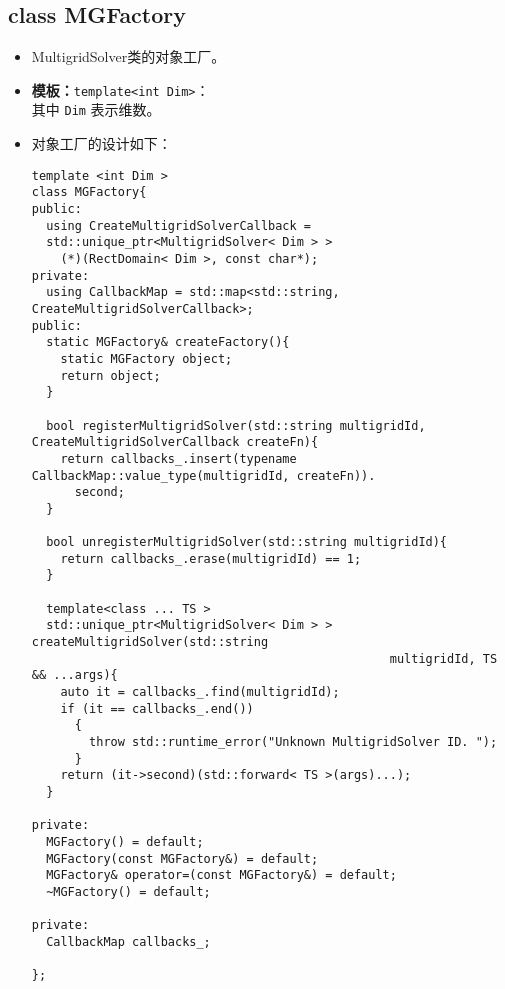 \documentclass[a4paper,twoside]{ctexart}
\begin{document}
\subsection*{class MGFactory}
\begin{itemize}
    \item MultigridSolver类的对象工厂。
    \item \textbf{模板：}\texttt{template<int Dim>}：\\
      其中 \texttt{Dim} 表示维数。
    \item 对象工厂的设计如下：
      \scriptsize
  \begin{lstlisting}
template <int Dim >
class MGFactory{
public:
  using CreateMultigridSolverCallback =
  std::unique_ptr<MultigridSolver< Dim > >
    (*)(RectDomain< Dim >, const char*);
private:
  using CallbackMap = std::map<std::string, CreateMultigridSolverCallback>;
public:
  static MGFactory& createFactory(){
    static MGFactory object;
    return object;
  }

  bool registerMultigridSolver(std::string multigridId, CreateMultigridSolverCallback createFn){
    return callbacks_.insert(typename CallbackMap::value_type(multigridId, createFn)).
      second;
  }

  bool unregisterMultigridSolver(std::string multigridId){
    return callbacks_.erase(multigridId) == 1;
  }

  template<class ... TS >
  std::unique_ptr<MultigridSolver< Dim > > createMultigridSolver(std::string
                                                  multigridId, TS && ...args){
    auto it = callbacks_.find(multigridId);
    if (it == callbacks_.end())
      {
        throw std::runtime_error("Unknown MultigridSolver ID. ");
      }
    return (it->second)(std::forward< TS >(args)...);
  }

private:
  MGFactory() = default;
  MGFactory(const MGFactory&) = default;
  MGFactory& operator=(const MGFactory&) = default;
  ~MGFactory() = default;
  
private:
  CallbackMap callbacks_;
  
};
  \end{lstlisting}


         
          
       
\end{itemize}
\end{document}
